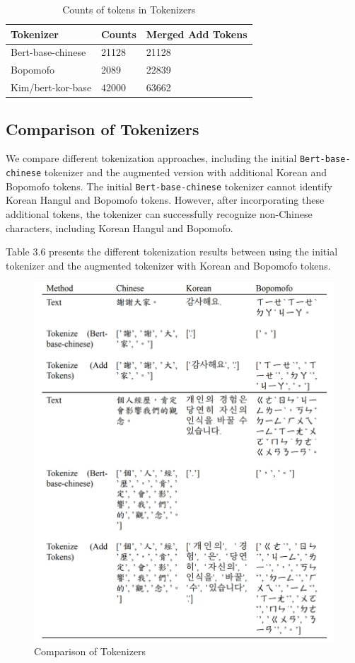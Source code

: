 \documentclass[PhD]{PHlab-thesis}
\begin{document}
\begin{table}
\begin{tabularx}{0.9\linewidth}{p{4cm} p{4cm} p{4cm}}
Tokenizer
& Counts
& Merged Add Tokens
\\
\toprule
Bert-base-chinese
& 21128
& 21128
\\
Bopomofo
&  2089
& 22839\\
Kim/bert-kor-base
& 42000
& 63662\\
\bottomrule
\end{tabularx}
\caption{Counts of tokens in Tokenizers}
\label{tab:notation}
\end{table}

\subsection{Comparison of Tokenizers}
We compare different tokenization approaches, including the initial \texttt{Bert-base-chinese} tokenizer and the augmented version with additional Korean and Bopomofo tokens. The initial \texttt{Bert-base-chinese} tokenizer cannot identify Korean Hangul and Bopomofo tokens. However, after incorporating these additional tokens, the tokenizer can successfully recognize non-Chinese characters, including Korean Hangul and Bopomofo.

Table 3.6 presents the different tokenization results between using the initial tokenizer and the augmented tokenizer with Korean and Bopomofo tokens.

\begin{figure}[h!]
  \centering
  \includegraphics[width=\linewidth]{tab_3_6.jpg}
  \captionsetup{type=table}
  \caption{Comparison of Tokenizers}
  \label{tab:compare_of_tokenizer}
\end{figure}
\end{document}
